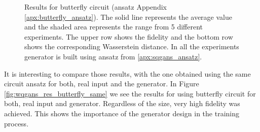 \begin{figure}[htbp!]
  \caption{Results for butterfly circuit (ansatz Appendix \ref{apx:butterfly_ansatz}).
    The solid line represents the average value and the shaded area
    represents the range from 5 different experiments. The upper row shows the
    fidelity and the bottom row shows the corresponding Wasserstein distance. In all the
    experiments generator is built using ansatz from \ref{apx:sqgans_ansatz}.}
  \label{fig:wqgans_res_butterfly_1}
\end{figure}

It is interesting to compare those results, with the one obtained using the
same circuit ansatz for both, real input and the generator. In Figure
\ref{fig:wqgans_res_butterfly_same} we see the results for using butterfly
circuit for both, real input and generator. Regardless of the size, very high
fidelity was achieved. This shows the importance of the generator design in the
training process.


